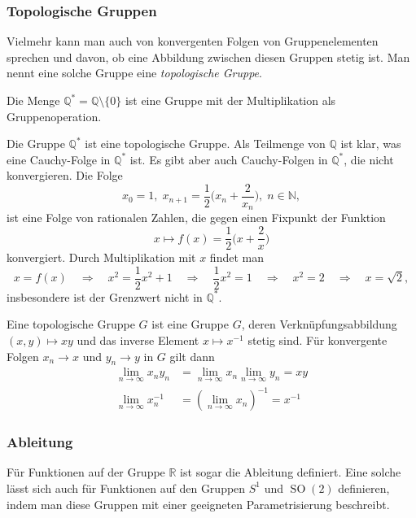 %
%
\subsubsection{Topologische Gruppen}
Vielmehr kann man auch von konvergenten Folgen von Gruppenelementen
sprechen und davon, ob eine Abbildung zwischen diesen Gruppen
stetig ist.
Man nennt eine solche Gruppe eine {\em topologische Gruppe}.
%

\begin{beispiel}
Die Menge
\(
\mathbb{Q}^*
=
\mathbb{Q} \setminus\{0\}
\)
ist eine Gruppe mit der Multiplikation als Gruppenoperation.
\end{beispiel}

Die Gruppe $\mathbb{Q}^*$ ist eine topologische Gruppe.
Als Teilmenge von $\mathbb{Q}$ ist klar, was eine Cauchy-Folge in
$\mathbb{Q}^*$ ist.
Es gibt aber auch Cauchy-Folgen in $\mathbb{Q}^*$, die nicht konvergieren.
Die Folge
\[
x_0=1,\;
x_{n+1} = \frac12\biggl(x_n+\frac{2}{x_n}\biggr),\; n\in\mathbb{N},
\]
ist eine Folge von rationalen Zahlen, die gegen einen Fixpunkt der
Funktion
\[
x\mapsto f(x)=\frac12\biggl(x+\frac{2}{x}\biggr)
\]
konvergiert.
Durch Multiplikation mit $x$ findet man
\[
x=f(x)
\quad\Rightarrow\quad
x^2=\frac12 x^2 + 1
\quad\Rightarrow\quad
\frac12x^2=1
\quad\Rightarrow\quad
x^2=2
\quad\Rightarrow\quad
x=\sqrt{2},
\]
insbesondere ist der Grenzwert nicht in $\mathbb{Q}^*$.

\begin{definition}
Eine topologische Gruppe $G$ ist eine Gruppe $G$, deren Verknüpfungsabbildung
$(x,y)\mapsto xy$ und das inverse Element $x\mapsto x^{-1}$ stetig sind.
Für konvergente Folgen $x_n\to x$ und $y_n\to y$ in $G$ gilt dann
\begin{align*}
\lim_{n\to \infty} x_ny_n &= \lim_{n\to\infty} x_n \lim_{n\to\infty} y_n = xy
\\
\lim_{n\to \infty} x_n^{-1} &= (\lim_{n\to\infty} x_n)^{-1} = x^{-1}
\end{align*}
\end{definition}

%
% 
%
\subsubsection{Ableitung}
Für Funktionen auf der Gruppe $\mathbb{R}$ ist sogar die Ableitung
definiert.
Eine solche lässt sich auch für Funktionen auf den Gruppen 
$S^1$ und $\operatorname{SO}(2)$ definieren, indem man diese Gruppen
mit einer geeigneten Parametrisierung beschreibt.



